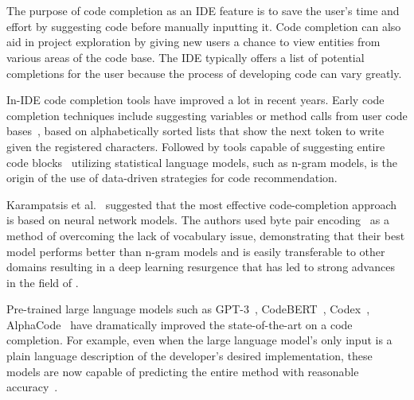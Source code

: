 \section{\cct{}}
The purpose of code completion as an IDE feature is to save the user's time and effort by suggesting code before manually inputting it. Code completion can also aid in project exploration by giving new users a chance to view entities from various areas of the code base. The IDE typically offers a list of potential completions for the user because the process of developing code can vary greatly.

In-IDE code completion tools have improved a lot in recent years. Early code completion techniques include suggesting variables or method calls from user code bases~\cite{mandelin2005}, based on alphabetically sorted lists that show the next token to write given the registered characters.
Followed by tools capable of suggesting entire code blocks~\cite{Ciniselli2021} utilizing statistical language models, such as n-gram models, is the origin of the use of data-driven strategies for code recommendation. 

Karampatsis et al.~\cite{karampatsis} suggested that the most effective code-completion approach is based on neural network models. 
The authors used byte pair encoding~\cite{BPE} as a method of overcoming the lack of vocabulary issue, demonstrating that their best model performs better than n-gram models and is easily transferable to other domains resulting in a deep learning resurgence that has led to strong advances in the field of \cct{}. 

Pre-trained large language models such as GPT-3~\cite{Gpt3}, CodeBERT~\cite{codebert}, Codex~\cite{copilot}, AlphaCode~\cite{alphacode} have dramatically improved the state-of-the-art on a code completion. 
For example, even when the large language model's only input is a plain language description of the developer's desired implementation, these models are now capable of predicting the entire method with reasonable accuracy~\cite{copilot}.